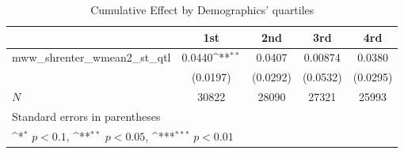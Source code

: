 \begin{table}[htbp]\centering
\def\sym#1{\ifmmode^{#1}\else\(^{#1}\)\fi}
\caption{Cumulative Effect by Demographics' quartiles}
\begin{tabular}{l*{4}{c}}
\hline\hline
            &\multicolumn{1}{c}{1st}&\multicolumn{1}{c}{2nd}&\multicolumn{1}{c}{3rd}&\multicolumn{1}{c}{4rd}\\
\hline
mww\_shrenter\_wmean2\_st\_qtl&      0.0440\sym{**} &      0.0407         &     0.00874         &      0.0380         \\
            &    (0.0197)         &    (0.0292)         &    (0.0532)         &    (0.0295)         \\
\hline
\(N\)       &       30822         &       28090         &       27321         &       25993         \\
\hline\hline
\multicolumn{5}{l}{\footnotesize Standard errors in parentheses}\\
\multicolumn{5}{l}{\footnotesize \sym{*} \(p<0.1\), \sym{**} \(p<0.05\), \sym{***} \(p<0.01\)}\\
\end{tabular}
\end{table}
